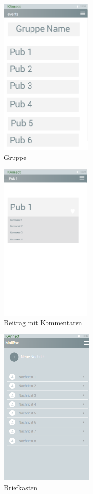 \documentclass[parskip=full]{scrartcl}
\begin{document}
						
		\begin{figure}[h]
			\centering
			\includegraphics[height=8cm]{Group}
			\caption{Gruppe}
			\label{Gruppe}
		\end{figure}
	

		
		\begin{figure}[h]
			\centering
			\includegraphics[height=8cm]{PubComments}
			\caption{Beitrag mit Kommentaren}
			\label{BeitragMitKommentaren}
		\end{figure}
			
		\begin{figure}[h]
			\centering
			\includegraphics[height=8cm]{Briefkasten}
			\caption{Briefkasten}
			\label{Briefkasten}
		\end{figure}
				
\end{document}
